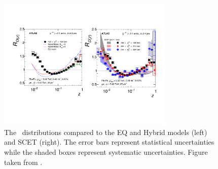 \begin{figure}[htbp]
\begin{center}
\includegraphics[width=0.75\textwidth]{figures/jetMeasurements/jetff_rdz_theory}
\caption{The \Rdz\ distributions compared to the EQ and Hybrid models (left) and SCET (right).
The error bars represent statistical uncertainties while the shaded boxes represent systematic uncertainties.
Figure taken from \cite{PhysRevC.98.024908}.}
\label{fig:jetff_rdz_theory}
\end{center}
\end{figure}



